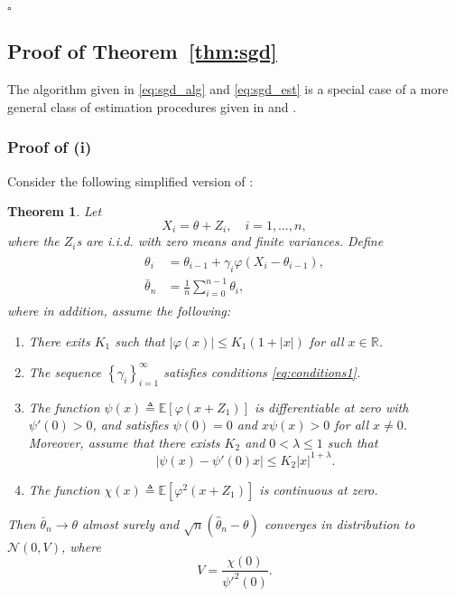 \documentclass[letterpaper, 11pt]{IEEEtran}      %
\newtheorem{thm}{\bf{Theorem}}
\newcommand{\ex}[1]{\ensuremath{\mathbb{E}\left[ #1\right]}}
\newcommand*{\QEDA}{\hfill\ensuremath{\square}}
\newcommand{\Ncal}{\mathcal{N}}
\begin{document}
\QEDA

\subsection{Proof of Theorem~\ref{thm:sgd}
\label{proof:thm:sgd}
}
The algorithm given in \eqref{eq:sgd_alg} and \eqref{eq:sgd_est} is a special case of a more general class of estimation procedures given in \cite{polyak1992acceleration} and \cite{polyak1990new}. 

\subsubsection*{Proof of (i)}
Consider the following simplified version of \cite[Thm. 4]{polyak1992acceleration}:
\begin{thm}{\cite[Thm. 4]{polyak1992acceleration}} \label{thm:polyak_juditsky}
Let 
\[
X_i = \theta + Z_i,\quad i=1,\ldots,n,
\]
where the $Z_i$s are i.i.d. with zero means and finite variances. Define
\begin{align}
\begin{split}
\theta_i & = \theta_{i-1} + \gamma_i \varphi(X_i - \theta_{i-1}), \\
\bar{\theta}_n & = \frac{1}{n} \sum_{i=0}^{n-1} \theta_i, 
\end{split}
\label{eq:Polyak_Juditsky_alg}
\end{align}
where in addition, assume the following: 
\begin{enumerate}
\item[(i)] There exits $K_1$ such that $\left| \varphi(x) \right| \leq K_1(1+|x|)$ for all $x\in \mathbb R$.
\item[(ii)] The sequence $\left\{ \gamma_i \right\}_{i=1}^\infty$ satisfies conditions \eqref{eq:conditions1}.
\item[(iii)] The function $\psi(x) \triangleq \ex{ \varphi(x+Z_1)}$ is differentiable at zero with $\psi'(0)>0$, and satisfies $\psi(0)=0$ and $x\psi(x) >0$ for all $x\neq 0$.
Moreover, assume that there exists $K_2$ and $0<\lambda \leq 1$ such that
\begin{equation}
\label{eq:Polyak_Juditsky_cond3}
\left| \psi(x) - \psi'(0)x \right|\leq K_2 |x|^{1+\lambda}.
\end{equation}
\item[(iv)] The function 
$\chi(x) \triangleq \ex{\varphi^2(x+Z_1)}$ is continuous at zero. 
\end{enumerate}
Then $\bar{\theta}_n \rightarrow \theta$ almost surely and $ \sqrt{n}(\hat{\theta}_n - \theta)$ converges in distribution to $\Ncal(0,V)$, where
\[
V = \frac{ \chi(0)} {\psi'^2(0)}. 
\]
\end{thm}
\end{document}
